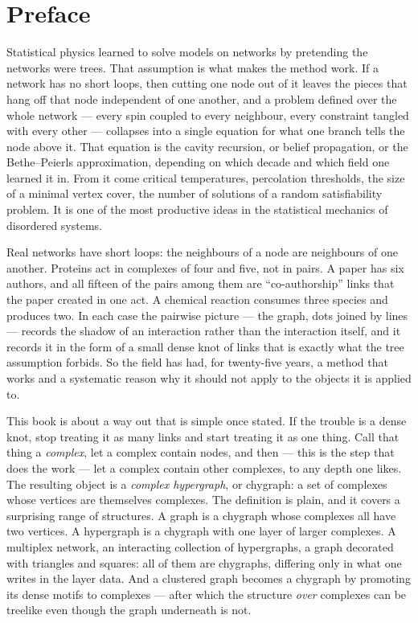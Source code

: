 \chapter*{Preface}

Statistical physics learned to solve models on networks by pretending the
networks were trees. That assumption is what makes the method work. If a network has no short loops, then cutting one node out of it
leaves the pieces that hang off that node independent of one another, and a
problem defined over the whole network --- every spin coupled to every
neighbour, every constraint tangled with every other --- collapses into a single
equation for what one branch tells the node above it. That equation is the
cavity recursion, or belief propagation, or the Bethe--Peierls approximation,
depending on which decade and which field one learned it in. From it come
critical temperatures, percolation thresholds, the size of a minimal vertex
cover, the number of solutions of a random satisfiability problem. It is one of
the most productive ideas in the statistical mechanics of disordered systems.

Real networks have short loops: the neighbours of a node are neighbours of one
another. Proteins act in complexes of four and five, not in pairs. A paper has six authors, and all
fifteen of the pairs among them are ``co-authorship'' links that the paper
created in one act. A chemical reaction consumes three species and produces
two. In each case the pairwise picture --- the graph, dots joined by lines ---
records the shadow of an interaction rather than the interaction itself, and it
records it in the form of a small dense knot of links that is exactly what the
tree assumption forbids. So the field has had, for twenty-five years, a method
that works and a systematic reason why it should not apply to the objects it is
applied to.

This book is about a way out that is simple once stated. If the trouble is a dense knot, stop treating it as many links and
start treating it as one thing. Call that thing a \emph{complex}, let a complex
contain nodes, and then --- this is the step that does the work --- let a
complex contain other complexes, to any depth one likes. The resulting object is
a \emph{complex hypergraph}, or chygraph: a set of complexes whose vertices are
themselves complexes. The definition is plain, and it covers a surprising range
of structures. A graph is a chygraph whose complexes all have two vertices.
A hypergraph is a chygraph with one layer of larger complexes. A multiplex
network, an interacting collection of hypergraphs, a graph decorated with
triangles and squares: all of them are chygraphs, differing only in what one
writes in the layer data. And a clustered graph becomes a chygraph by promoting
its dense motifs to complexes --- after which the structure \emph{over}
complexes can be treelike even though the graph underneath is not.

